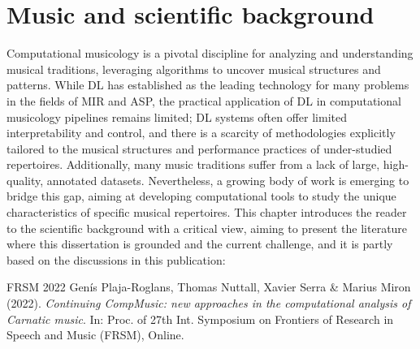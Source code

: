 
\chapter{Music and scientific background}
\label{ch02_sb}

Computational musicology is a pivotal discipline for analyzing and understanding musical traditions, leveraging algorithms to uncover musical structures and patterns. While \acrfull{DL} has established as the leading technology for many problems in the fields of \acrfull{MIR} and \acrfull{ASP}, the practical application of \acrshort{DL} in computational musicology pipelines remains limited; \acrshort{DL} systems often offer limited interpretability and control, and there is a scarcity of methodologies explicitly tailored to the musical structures and performance practices of under-studied repertoires.
%
Additionally, many music traditions suffer from a lack of large, high-quality, annotated datasets. Nevertheless, a growing body of work is emerging to bridge this gap, aiming at developing computational tools to study the unique characteristics of specific musical repertoires.
%
This chapter introduces the reader to the scientific background with a critical view, aiming to present the literature where this dissertation is grounded and the current challenge, and it is partly based on the discussions in this publication:

\begin{mybox}{FRSM 2022}
    Genís Plaja-Roglans, Thomas Nuttall, Xavier Serra \& Marius Miron (2022).
    \emph{Continuing CompMusic: new approaches in the computational analysis of Carnatic music}.
    In: Proc. of 27th Int. Symposium on Frontiers of Research in Speech and Music (FRSM), Online.  %
 \end{mybox}


